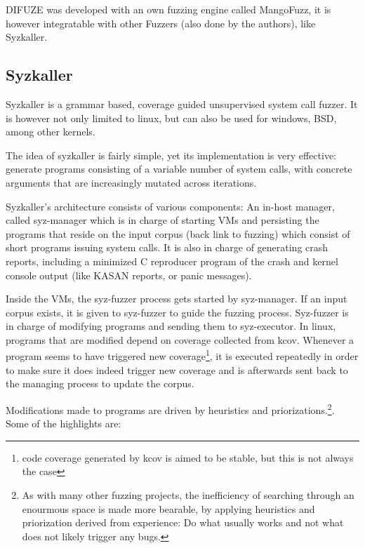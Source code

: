DIFUZE was developed with an own fuzzing engine called MangoFuzz, it is however integratable with other Fuzzers (also done by the authors), like Syzkaller.



\subsection{Syzkaller}

Syzkaller is a grammar based, coverage guided unsupervised
system call fuzzer. It is however not only
limited to linux, but can also be used for windows, BSD, among other
kernels.

The idea of syzkaller is fairly simple, yet its implementation is very effective: generate programs consisting of a variable number of system calls, with
concrete arguments that are increasingly mutated across iterations.


Syzkaller's architecture consists of various components: An in-host manager, called
syz-manager which is in charge of starting VMs and persisting the programs that
reside on the input corpus (back link to fuzzing) which consist of short programs issuing
system calls. It is also in charge of generating crash reports, including a minimized C reproducer program of the crash and kernel console output (like KASAN reports, or panic
messages).

Inside the VMs, the syz-fuzzer process gets started by syz-manager. If an input
corpus exists, it is given to syz-fuzzer to guide the fuzzing process. Syz-fuzzer is
in charge of modifying programs and sending them to syz-executor. In linux, programs that
are modified depend on coverage collected from kcov. Whenever a program seems to have triggered new coverage\footnote{code coverage generated by kcov is aimed to be stable, but this is not always the case},
it is executed repeatedly in order to make sure it does indeed trigger new coverage and is
afterwards sent back to the managing process to update the corpus.

Modifications made to programs are driven by heuristics and priorizations.\footnote{As with many other fuzzing projects, the inefficiency of searching through an enourmous space is made more bearable, by applying heuristics and priorization derived from experience: Do what usually works and not what does not likely trigger any bugs.}. Some of the highlights are\cite{bluehatil2020}:

